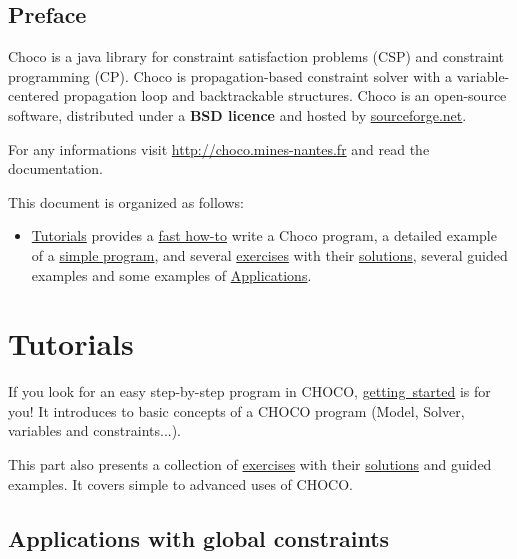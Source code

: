 \chapter*{Preface}
Choco is a java library for constraint satisfaction problems (CSP) and constraint programming (CP). 
Choco is propagation-based constraint solver with a variable-centered propagation loop and backtrackable structures.
Choco is an open-source software, distributed under a \textbf{BSD licence} and hosted by \href{http://sourceforge.net/projects/choco/}{sourceforge.net}.

For any informations visit \url{http://choco.mines-nantes.fr} and read the documentation.
\bigskip

\noindent This document is organized as follows:
\begin{itemize}
\item \hyperlink{ch:tut}{Tutorials} provides a \hyperlink{gettingstarted:gettingstarted:welcometochoco}{fast how-to} write a Choco program, a detailed example of a \hyperlink{gettingstarted:firstexample:magicsquare}{simple program}, and several \hyperlink{exercises}{exercises} with their \hyperlink{solutions}{solutions},  several guided examples  and some examples of \hyperlink{doc:applications}{Applications}.
\end{itemize}

\part{Tutorials}\label{ch:tut}\hypertarget{ch:tut}{}
If you look for an easy step-by-step program in CHOCO, \hyperlink{gettingstarted}{getting\ started} is for you! It introduces to basic concepts of a CHOCO program (Model, Solver, variables and constraints...).

This part also presents a collection of \hyperlink{exercises}{exercises} with their \hyperlink{solutions}{solutions} and guided examples. It covers simple to advanced uses of CHOCO.






\chapter{Applications with global constraints}\label{doc:applications}\hypertarget{doc:applications}{}

\newpage 
